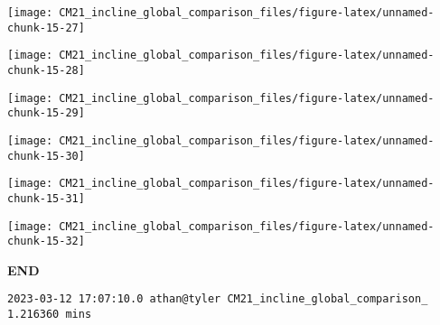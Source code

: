 \documentclass[
  10pt,
  a4paper,oneside]{article}
\begin{document}
\begin{center}\texttt{[image: CM21\_incline\_global\_comparison\_files/figure-latex/unnamed-chunk-15-27]} \end{center}

\begin{center}\texttt{[image: CM21\_incline\_global\_comparison\_files/figure-latex/unnamed-chunk-15-28]} \end{center}

\begin{center}\texttt{[image: CM21\_incline\_global\_comparison\_files/figure-latex/unnamed-chunk-15-29]} \end{center}

\begin{center}\texttt{[image: CM21\_incline\_global\_comparison\_files/figure-latex/unnamed-chunk-15-30]} \end{center}

\begin{center}\texttt{[image: CM21\_incline\_global\_comparison\_files/figure-latex/unnamed-chunk-15-31]} \end{center}

\begin{center}\texttt{[image: CM21\_incline\_global\_comparison\_files/figure-latex/unnamed-chunk-15-32]} \end{center}

\textbf{END}

\begin{verbatim}
2023-03-12 17:07:10.0 athan@tyler CM21_incline_global_comparison_ 1.216360 mins
\end{verbatim}
\end{document}
